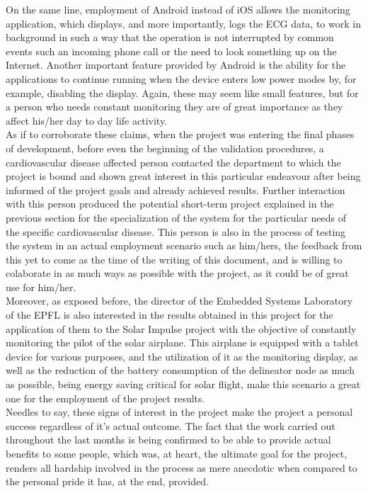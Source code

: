 		On the same line, employment of Android instead of iOS allows the monitoring application, which displays, and more importantly, logs the ECG data, to work in background in such a way that the operation is not interrupted by common events such an incoming phone call or the need to look something up on the Internet. Another important feature provided by Android is the ability for the applications to continue running when the device enters low power modes by, for example, disabling the display. Again, these may seem like small features, but for a person who needs constant monitoring they are of great importance as they affect his/her day to day life activity.\\

		As if to corroborate these claims, when the project was entering the final phases of development, before even the beginning of the validation procedures, a cardiovascular disease affected person contacted the department to which the project is bound and shown great interest in this particular endeavour after being informed of the project goals and already achieved results. Further interaction with this person produced the potential short-term project explained in the previous section for the specialization of the system for the particular needs of the specific cardiovascular disease. This person is also in the process of testing the system in an actual employment scenario such as him/hers, the feedback from this yet to come as the time of the writing of this document, and is willing to colaborate in as much ways as possible with the project, as it could be of great use for him/her.\\

		Moreover, as exposed before, the director of the Embedded Systems Laboratory of the EPFL is also interested in the results obtained in this project for the application of them to the Solar Impulse project with the objective of constantly monitoring the pilot of the solar airplane. This airplane is equipped with a tablet device for various purposes, and the utilization of it as the monitoring display, as well as the reduction of the battery consumption of the delineator node as much as possible, being energy saving critical for solar flight, make this scenario a great one for the employment of the project results.\\

		Needles to say, these signs of interest in the project make the project a personal success regardless of it's actual outcome. The fact that the work carried out throughout the last months is being confirmed to be able to provide actual benefits to some people, which was, at heart, the ultimate goal for the project, renders all hardship involved in the process as mere anecdotic when compared to the personal pride it has, at the end, provided.
